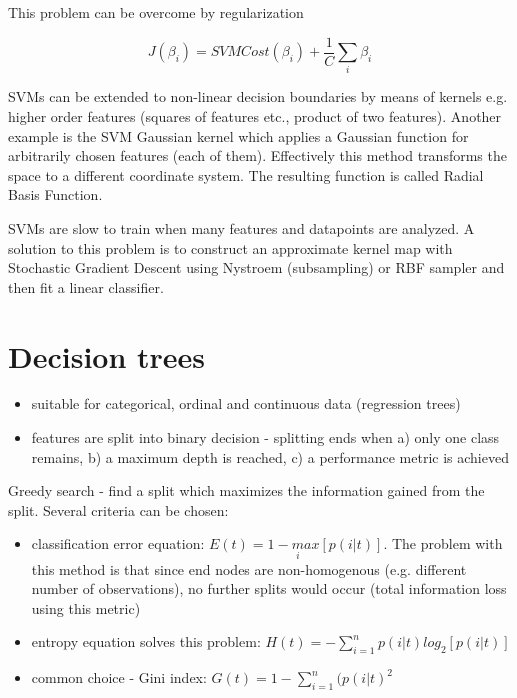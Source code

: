 \documentclass[11pt]{book}
\begin{document}
This problem can be overcome by regularization

\begin{equation}
    J(\beta_i) = SVMCost(\beta_i) + \frac{1}{C}\sum_i\beta_i
\end{equation}

SVMs can be extended to non-linear decision boundaries by means of kernels e.g. higher order features (squares of features etc., product of two features). Another example is the SVM Gaussian kernel which applies a Gaussian function for arbitrarily chosen features (each of them). Effectively this method transforms the space to a different coordinate system. The  resulting function is called Radial Basis Function.

SVMs are slow to train when many features and datapoints are analyzed. A solution to this problem is to construct an approximate kernel map with Stochastic Gradient Descent using Nystroem (subsampling) or RBF sampler and then fit a linear classifier. 

\section{Decision trees}

\begin{itemize}
    \item suitable for categorical, ordinal and continuous data (regression trees)
    \item features are split into binary decision - splitting ends when a) only one class remains, b) a maximum depth is reached, c) a performance metric is achieved
\end{itemize}

Greedy search - find a split which maximizes the information gained from the split. Several criteria can be chosen:

\begin{itemize}
    \item classification error equation: $E(t) = 1 - \underset{i}max[p(i|t)]$. The problem with this method is that since end nodes are non-homogenous (e.g. different number of observations), no further splits would occur (total information loss using this metric)
    \item entropy equation solves this problem: $H(t) = -\sum_{i=1}^n p(i|t)log_2[p(i|t)]$
    \item common choice - Gini index: $G(t)=1-\sum_{i=1}^n(p(i|t)^2$
\end{itemize}
\vline    
    
\end{document}
